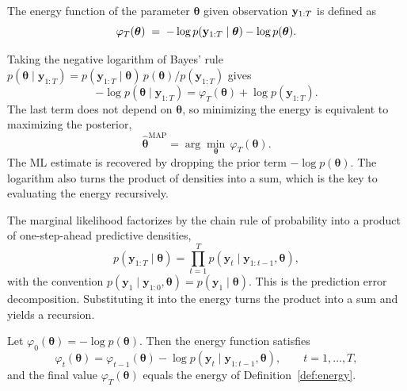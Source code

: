 \begin{definition}
The energy function of the parameter $\boldsymbol{\theta}$ given observation $\mathbf{y}_{1:T}$ is defined as 
\begin{equation}\label{def:energy}
    \varphi_T(\boldsymbol{\theta})\;=\; -\log p(\mathbf{y}_{1:T} \mid \boldsymbol{\theta})-\log p(\boldsymbol{\theta}).
\end{equation}
\end{definition}
Taking the negative logarithm of Bayes' rule $p(\boldsymbol{\theta} \mid \mathbf{y}_{1:T}) = p(\mathbf{y}_{1:T} \mid \boldsymbol{\theta})\, p(\boldsymbol{\theta}) / p(\mathbf{y}_{1:T})$ gives
\begin{equation}
    -\log p(\boldsymbol{\theta} \mid \mathbf{y}_{1:T}) = \varphi_T(\boldsymbol{\theta}) + \log p(\mathbf{y}_{1:T}).
\end{equation}
The last term does not depend on $\boldsymbol{\theta}$, so minimizing the energy is equivalent to maximizing the posterior,
\begin{equation}\label{eq:map_energy}
    \hat{\boldsymbol{\theta}}^{\mathrm{MAP}} = \arg\min_{\boldsymbol{\theta}} \, \varphi_T(\boldsymbol{\theta}).
\end{equation}
The ML estimate is recovered by dropping the prior term $-\log p(\boldsymbol{\theta})$. The logarithm also turns the product of densities into a sum, which is the key to evaluating the energy recursively.

The marginal likelihood factorizes by the chain rule of probability into a product of one-step-ahead predictive densities,
\begin{equation}\label{eq:prediction_error_decomposition}
    p(\mathbf{y}_{1:T} \mid \boldsymbol{\theta})
    = \prod_{t=1}^{T} p(\mathbf{y}_t \mid \mathbf{y}_{1:t-1}, \boldsymbol{\theta}),
\end{equation}
with the convention $p(\mathbf{y}_1 \mid \mathbf{y}_{1:0}, \boldsymbol{\theta}) = p(\mathbf{y}_1 \mid \boldsymbol{\theta})$. This is the prediction error decomposition. Substituting it into the energy turns the product into a sum and yields a recursion.

\begin{theorem}\label{thm:energy_recursion}
Let $\varphi_0(\boldsymbol{\theta}) = -\log p(\boldsymbol{\theta})$. Then the energy function satisfies
\begin{equation}\label{eq:energy_recursion}
    \varphi_t(\boldsymbol{\theta}) = \varphi_{t-1}(\boldsymbol{\theta}) - \log p(\mathbf{y}_t \mid \mathbf{y}_{1:t-1}, \boldsymbol{\theta}), \qquad t = 1, \dots, T,
\end{equation}
and the final value $\varphi_T(\boldsymbol{\theta})$ equals the energy of Definition~\ref{def:energy}.
\end{theorem}

